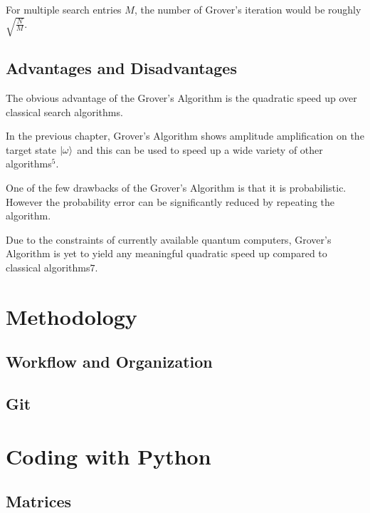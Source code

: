\documentclass{article}
\begin{document}
\noindent
For multiple search entries $M$, the number of Grover's iteration would be roughly $\sqrt{\frac{N}{M}}$.
\vspace{10mm}

\subsection{Advantages and Disadvantages}
\vspace{5mm}

\noindent
The obvious advantage of the Grover's Algorithm is the quadratic speed up over classical search algorithms. 
\vspace{5mm}

\noindent
In the previous chapter, Grover's Algorithm shows amplitude amplification on the target state $\ket{\omega}$ and this can be used to speed up a wide variety of other algorithms\hyperlink{5}{$^5$}. 
\vspace{5mm}

\noindent
One of the few drawbacks of the Grover's Algorithm is that it is probabilistic. However the probability error can be significantly reduced by repeating the algorithm.
\vspace{5mm}

\noindent
Due to the constraints of currently available quantum computers, Grover's Algorithm is yet to yield any  meaningful quadratic speed up compared to classical algorithms\hyperlink{7}{$7$}.   
\pagebreak

\section{Methodology}

\subsection{Workflow and Organization}

\subsection{Git}

\section{Coding with Python}


\subsection{Matrices}
\end{document}
